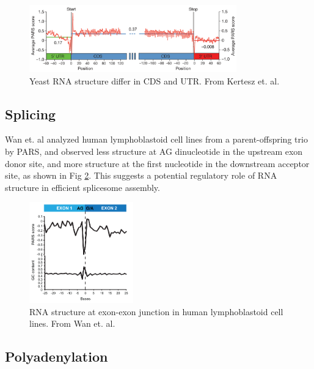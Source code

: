 \documentclass{proposal}
\begin{document}
\begin{figure}[h!]
    \centering
    \includegraphics[width=0.8\textwidth]{yeast_cds_utr.png}
    \caption{Yeast RNA structure differ in CDS and UTR. From Kertesz et. al\cite{kertesz2010genome}.}
    \label{fig:yeast_cds_utr}
    \centering
\end{figure}



\subsection*{Splicing}

Wan et. al\cite{wan2014landscape} analyzed human lymphoblastoid cell lines from a parent-offspring trio by PARS,
and observed less structure at AG dinucleotide in the upstream exon donor site,
and more structure at the first nucleotide in the downstream acceptor site, as shown in Fig \ref{fig:exon_exon_junction}.
This suggests a potential regulatory role of RNA structure in efficient splicesome assembly.


\begin{figure}[h!]
    \centering
    \includegraphics[width=0.4\textwidth]{exon_exon_junction.png}
    \caption{RNA structure at exon-exon junction in human lymphoblastoid cell lines. From Wan et. al\cite{wan2014landscape}.}
    \label{fig:exon_exon_junction}
    \centering
\end{figure}


\subsection*{Polyadenylation}
\end{document}
